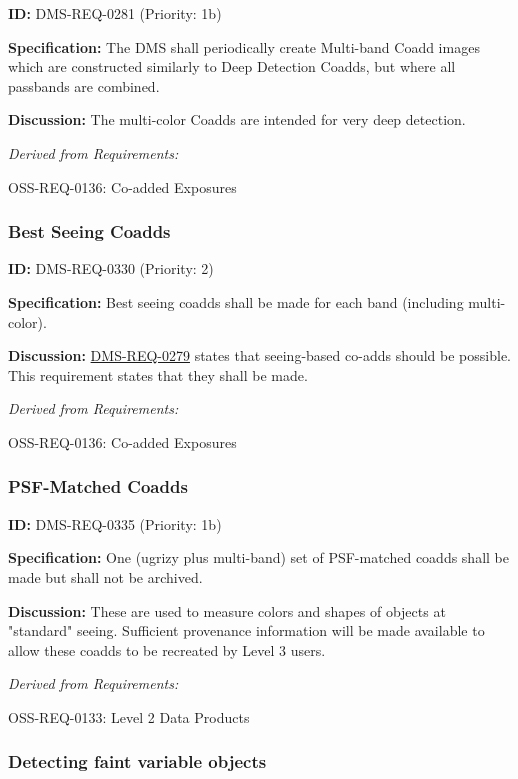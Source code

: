 \documentclass[SE,toc,lsstdraft]{lsstdoc}
\begin{document}
\label{DMS-REQ-0281}
\textbf{ID:} DMS-REQ-0281 (Priority: 1b)

\textbf{Specification:} The DMS shall periodically create Multi-band Coadd images which are constructed similarly to Deep Detection Coadds, but where all passbands are combined.

\textbf{Discussion: }The multi-color Coadds are intended for very deep detection.

\emph{Derived from Requirements:}

OSS-REQ-0136:
Co-added Exposures \newline

\subsubsection{Best Seeing Coadds}

\label{DMS-REQ-0330}
\textbf{ID:} DMS-REQ-0330 (Priority: 2)

\textbf{Specification:} Best seeing coadds shall be made for each band (including multi-color).

\textbf{Discussion:} \hyperref[DMS-REQ-0279]{DMS-REQ-0279} states that seeing-based co-adds should be possible. This requirement states that they shall be made.

\emph{Derived from Requirements:}

OSS-REQ-0136:
Co-added Exposures \newline

\subsubsection{PSF-Matched Coadds}

\label{DMS-REQ-0335}
\textbf{ID:} DMS-REQ-0335 (Priority: 1b)

\textbf{Specification:} One (ugrizy plus multi-band) set of PSF-matched coadds shall be made but shall not be archived.

\textbf{Discussion:} These are used to measure colors and shapes of objects at "standard" seeing. Sufficient provenance information will be made available to allow these coadds to be recreated by Level 3 users.

\emph{Derived from Requirements:}

OSS-REQ-0133:
Level 2 Data Products \newline

\subsubsection{Detecting faint variable objects}
\end{document}
